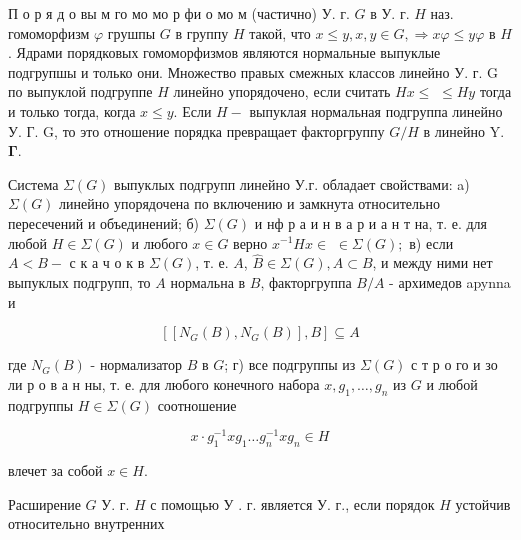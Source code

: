 \documentclass[10pt]{article}
\begin{document}
П о р я д о вы м го мо мо р фи $о$ мо м (частично) У. г. $G$ в У. г. $H$ наз. гомоморфизм $\varphi$ грушпы $G$ в группу $H$ такой, что $x \leqslant y, x, y \in G, \Rightarrow x \varphi \leqslant y \varphi$ в $H$. Ядрами порядковых гомоморфизмов являются нормальные выпуклые подгрупшы и только они. Множество правых смежных классов линейно У. г. G по выпуклой подгруппе $H$ линейно упорядочено, если считать $H x \leqslant$ $\leqslant H y$ тогда и только тогда, когда $x \leqslant y$. Если $H-$ выпуклая нормальная подгруппа линейно У. Г. G, то это отношение порядка превращает факторгруппу $G / H$ в линейно $\mathrm{Y}$. $\boldsymbol{\Gamma}$.



Система $\Sigma(G)$ выпуклых подгрупп линейно У.г. обладает свойствами: a) $\Sigma(G)$ линейно упорядочена по включению и замкнута относительно пересечений и объединений; б) $\Sigma(G)$ и нф р а и н в а р и а н т на, т. е. для любой $H \in \Sigma(G)$ и любого $x \in G$ верно $x^{-1} H x \in$ $\in \Sigma(G) ;$ в) если $A<B-$ с к а ч о к в $\Sigma(G)$, т. е. $A$, $\widehat{B} \in \Sigma(G), A \subset B$, и между ними нет выпуклых подгрупп, то $A$ нормальна в $B$, факторгруппа $B / A$ - архимедов apynna и



\[

\left[\left[N_{G}(B), N_{G}(B)\right], B\right] \subseteq A

\]



где $N_{G}(B)$ - нормализатор $B$ в $G$; г) все подгруппы из $\Sigma(G)$ с т р о го и зо ли р о в а н ны, т. е. для любого конечного набора $x, g_{1}, \ldots, g_{n}$ из $G$ и любой подгруппы $H \in \Sigma(G)$ соотношение



\[

x \cdot g_{1}^{-1} x g_{1} \ldots g_{n}^{-1} x g_{n} \in H

\]



влечет за собой $x \in H$.



Расширение $G$ У. г. $H$ с помощью У . г. является У. г., если порядок $H$ устойчив относительно внутренних
\end{document}
